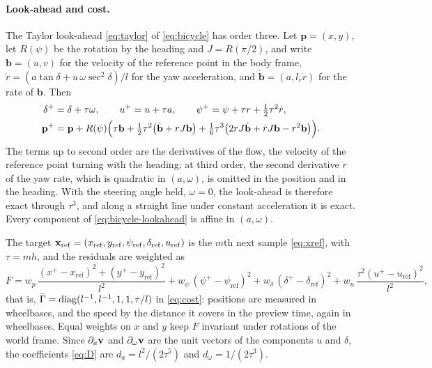 \paragraph{Look-ahead and cost.}
The Taylor look-ahead \eqref{eq:taylor} of \eqref{eq:bicycle} has order three.
Let $\mathbf{p} = (x,y)$, let $R(\psi)$ be the rotation by the heading and $J = R(\pi/2)$, and write
$\mathbf{b} = (u,v)$ for the velocity of the reference point in the body frame,
$\dot r = (a\tan\delta + u\,\omega\sec^2\delta)/l$ for the yaw acceleration, and
$\dot{\mathbf{b}} = (a, l_r\dot r)$ for the rate of $\mathbf{b}$.
Then
\begin{equation}\label{eq:bicycle-lookahead}
\begin{aligned}
    \delta^+ &= \delta + \tau\omega, \qquad u^+ = u + \tau a, \qquad
    \psi^+ = \psi + \tau r + \tfrac12\tau^2\dot r, \\
    \mathbf{p}^+ &= \mathbf{p} + R(\psi)\Bigl(\tau\mathbf{b}
    + \tfrac12\tau^2\bigl(\dot{\mathbf{b}} + rJ\mathbf{b}\bigr)
    + \tfrac16\tau^3\bigl(2rJ\dot{\mathbf{b}} + \dot r J\mathbf{b} - r^2\mathbf{b}\bigr)\Bigr).
\end{aligned}
\end{equation}
The terms up to second order are the derivatives of the flow, the velocity of the reference point
turning with the heading; at third order, the second derivative $\ddot r$ of the yaw rate, which is
quadratic in $(a,\omega)$, is omitted in the position and in the heading.
With the steering angle held, $\omega = 0$, the look-ahead is therefore exact through $\tau^3$, and
along a straight line under constant acceleration it is exact.
Every component of \eqref{eq:bicycle-lookahead} is affine in $(a,\omega)$.

The target $\mathbf{x}_{\mathrm{ref}} = (x_{\mathrm{ref}},y_{\mathrm{ref}},\psi_{\mathrm{ref}},\delta_{\mathrm{ref}},
u_{\mathrm{ref}})$ is the $m$th next sample \eqref{eq:xref}, with $\tau = mh$, and the residuals are
weighted as
\begin{equation}\label{eq:bicycle-cost}
    F = w_p\,\frac{(x^+ - x_{\mathrm{ref}})^2 + (y^+ - y_{\mathrm{ref}})^2}{l^2}
    + w_\psi\,(\psi^+ - \psi_{\mathrm{ref}})^2 + w_\delta\,(\delta^+ - \delta_{\mathrm{ref}})^2
    + w_u\,\frac{\tau^2(u^+ - u_{\mathrm{ref}})^2}{l^2},
\end{equation}
that is, $\bar\Gamma = \operatorname{diag}(l^{-1},l^{-1},1,1,\tau/l)$ in \eqref{eq:cost}: positions are measured
in wheelbases, and the speed by the distance it covers in the preview time, again in wheelbases.
Equal weights on $x$ and $y$ keep $F$ invariant under rotations of the world frame.
Since $\partial_a\mathbf{v}$ and $\partial_\omega\mathbf{v}$ are the unit vectors of the components $u$ and
$\delta$, the coefficients \eqref{eq:D} are $d_a = l^2/(2\tau^5)$ and $d_\omega = 1/(2\tau^3)$.

